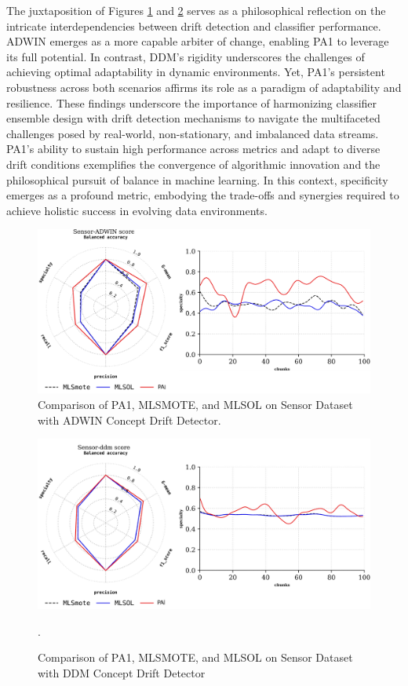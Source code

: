 The juxtaposition of Figures \ref{fig:4_first_proposal_result_exp_3} and \ref{fig:4_first_proposal_result_exp_4} serves as a philosophical reflection on the intricate interdependencies between drift detection and classifier performance. ADWIN emerges as a more capable arbiter of change, enabling PA1 to leverage its full potential. In contrast, DDM’s rigidity underscores the challenges of achieving optimal adaptability in dynamic environments. Yet, PA1’s persistent robustness across both scenarios affirms its role as a paradigm of adaptability and resilience. These findings underscore the importance of harmonizing classifier ensemble design with drift detection mechanisms to navigate the multifaceted challenges posed by real-world, non-stationary, and imbalanced data streams. PA1’s ability to sustain high performance across metrics and adapt to diverse drift conditions exemplifies the convergence of algorithmic innovation and the philosophical pursuit of balance in machine learning. In this context, specificity emerges as a profound metric, embodying the trade-offs and synergies required to achieve holistic success in evolving data environments.
 
\begin{figure}[H]
	\centering
	\includegraphics[width=1\linewidth]{4_Imbalanced/figures/exp_3.png}
  \caption{Comparison of PA1, MLSMOTE, and MLSOL on Sensor Dataset with ADWIN Concept Drift Detector.}
	\label{fig:4_first_proposal_result_exp_3}
\end{figure}

\begin{figure}[H]
	\centering
	\includegraphics[width=1\linewidth]{4_Imbalanced/figures/exp_4.png}
  \caption{Comparison of PA1, MLSMOTE, and MLSOL on Sensor Dataset with DDM Concept Drift Detector}.
	\label{fig:4_first_proposal_result_exp_4}
\end{figure}

